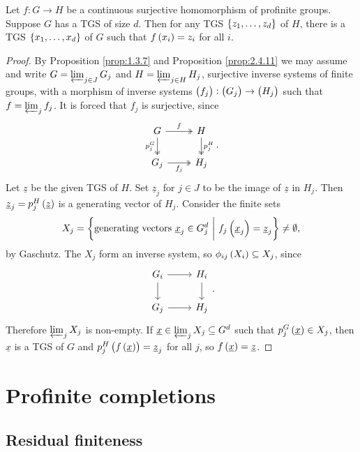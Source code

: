 \begin{theorem}
Let $ f : G \to H $ be a continuous surjective homomorphism of profinite groups. Suppose $ G $ has a TGS of size $ d $. Then for any TGS $ \cbr{z_1, \dots, z_d} $ of $ H $, there is a TGS $ \cbr{x_1, \dots, x_d} $ of $ G $ such that $ f\br{x_i} = z_i $ for all $ i $.
\end{theorem}

\begin{proof}
By Proposition \ref{prop:1.3.7} and Proposition \ref{prop:2.4.11} we may assume and write $ G = \varprojlim_{j \in J} G_j $ and $ H = \varprojlim_{j \in H} H_j $, surjective inverse systems of finite groups, with a morphism of inverse systems $ \br{f_j} : \br{G_j} \to \br{H_j} $ such that $ f = \varprojlim_j f_j $. It is forced that $ f_j $ is surjective, since
$$
\begin{tikzcd}
G \arrow[twoheadrightarrow]{r}{f} \arrow[twoheadrightarrow]{d}[swap]{p_j^G} & H \arrow[twoheadrightarrow]{d}{p_j^H} \\
G_j \arrow[twoheadrightarrow]{r}[swap]{f_j} & H_j
\end{tikzcd}.
$$
Let $ \underline{z} $ be the given TGS of $ H $. Set $ \underline{z}_j $ for $ j \in J $ to be the image of $ \underline{z} $ in $ H_j $. Then $ \underline{z}_j = p_j^H\br{\underline{z}} $ is a generating vector of $ H_j $. Consider the finite sets
$$ X_j = \cbr{\text{generating vectors} \ \underline{x}_j \in G_j^d \st f_j\br{\underline{x}_j} = \underline{z}_j} \ne \emptyset, $$
by Gaschutz. The $ X_j $ form an inverse system, so $ \phi_{ij}\br{X_i} \subseteq X_j $, since
$$
\begin{tikzcd}
G_i \arrow{r} \arrow{d} & H_i \arrow{d} \\
G_j \arrow{r} & H_j
\end{tikzcd}.
$$
Therefore $ \varprojlim_j X_j $ is non-empty. If $ \underline{x} \in \varprojlim_j X_j \subseteq G^d $ such that $ p_j^G\br{\underline{x}} \in X_j $, then $ \underline{x} $ is a TGS of $ G $ and $ p_j^H\br{f\br{\underline{x}}} = \underline{z}_j $ for all $ j $, so $ f\br{\underline{x}} = \underline{z} $.
\end{proof}

\pagebreak

\section{Profinite completions}

\subsection{Residual finiteness}

